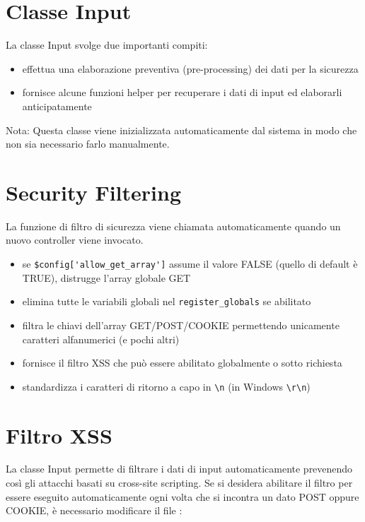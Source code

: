 \section{Classe Input}
\label{class:input}

La classe Input svolge due importanti compiti:

\begin{itemize}
\item effettua una elaborazione preventiva (pre-processing) dei dati per la sicurezza
\item fornisce alcune funzioni helper per recuperare i dati di input ed elaborarli anticipatamente
\end{itemize}

Nota: Questa classe viene inizializzata automaticamente dal sistema in modo che non sia necessario farlo manualmente.

\section*{Security Filtering}
La funzione di filtro di sicurezza viene chiamata automaticamente quando un nuovo controller viene invocato. 

\begin{itemize}
\item se \verb|$config['allow_get_array']| assume il valore FALSE (quello di default è TRUE), distrugge l'array globale GET
\item elimina tutte le variabili globali nel \verb|register_globals| se abilitato
\item filtra le chiavi dell'array GET/POST/COOKIE permettendo unicamente caratteri alfanumerici (e pochi altri)
\item fornisce il filtro \ac{XSS} che può essere abilitato globalmente o sotto richiesta
\item standardizza i caratteri di ritorno a capo in \verb|\n| (in Windows \verb|\r\n|)
\end{itemize}

\section*{Filtro XSS}
La classe Input permette di filtrare i dati di input automaticamente prevenendo così gli attacchi basati su cross-site scripting. Se si desidera abilitare il filtro per essere eseguito automaticamente ogni volta che si incontra un dato POST oppure COOKIE, è necessario modificare il file :

